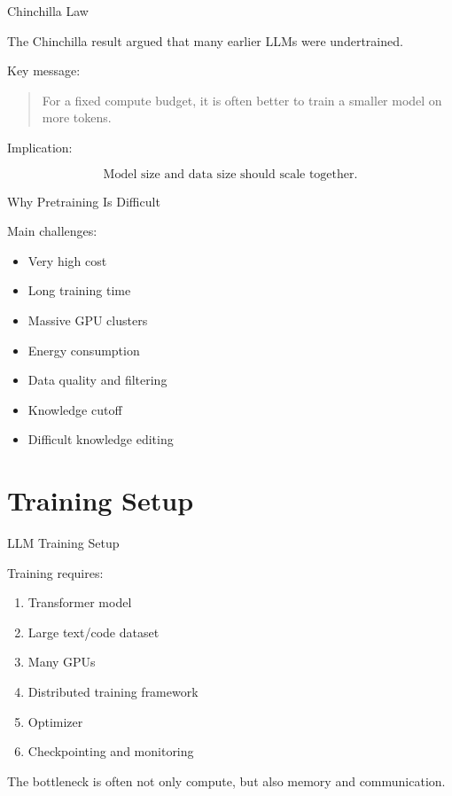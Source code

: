\documentclass[aspectratio=169]{beamer}
\begin{document}
\begin{frame}{Chinchilla Law}

The Chinchilla result argued that many earlier LLMs were undertrained.

\vspace{0.5cm}

Key message:

\begin{quote}
For a fixed compute budget, it is often better to train a smaller model on more tokens.
\end{quote}

\vspace{0.5cm}

Implication:

\[
\text{Model size and data size should scale together.}
\]

\end{frame}

\begin{frame}{Why Pretraining Is Difficult}

Main challenges:

\begin{itemize}
    \item Very high cost
    \item Long training time
    \item Massive GPU clusters
    \item Energy consumption
    \item Data quality and filtering
    \item Knowledge cutoff
    \item Difficult knowledge editing
\end{itemize}

\end{frame}

\section{Training Setup}

\begin{frame}{LLM Training Setup}

Training requires:

\begin{enumerate}
    \item Transformer model
    \item Large text/code dataset
    \item Many GPUs
    \item Distributed training framework
    \item Optimizer
    \item Checkpointing and monitoring
\end{enumerate}

\vspace{0.4cm}

The bottleneck is often not only compute, but also memory and communication.

\end{frame}
\end{document}
